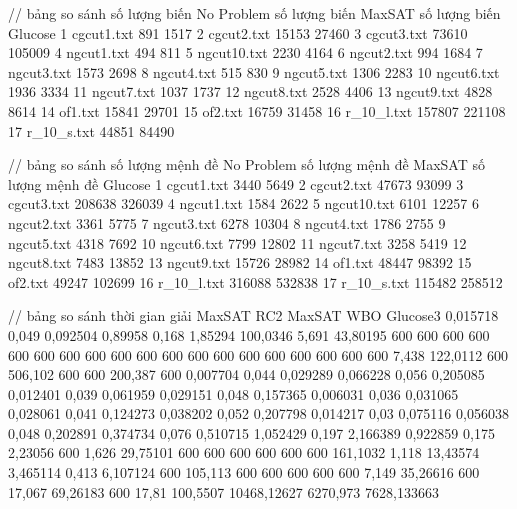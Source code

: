 // bảng so sánh số lượng biến
No	Problem	số lượng biến MaxSAT	số lượng biến Glucose
1	cgcut1.txt	891	1517
2	cgcut2.txt	15153	27460
3	cgcut3.txt	73610	105009
4	ngcut1.txt	494	811
5	ngcut10.txt	2230	4164
6	ngcut2.txt	994	1684
7	ngcut3.txt	1573	2698
8	ngcut4.txt	515	830
9	ngcut5.txt	1306	2283
10	ngcut6.txt	1936	3334
11	ngcut7.txt	1037	1737
12	ngcut8.txt	2528	4406
13	ngcut9.txt	4828	8614
14	of1.txt	15841	29701
15	of2.txt	16759	31458
16	r_10_l.txt	157807	221108
17	r_10_s.txt	44851	84490

// bảng so sánh số lượng mệnh đề
No	Problem	số lượng mệnh đề MaxSAT	số lượng mệnh đề Glucose
1	cgcut1.txt	3440	5649
2	cgcut2.txt	47673	93099
3	cgcut3.txt	208638	326039
4	ngcut1.txt	1584	2622
5	ngcut10.txt	6101	12257
6	ngcut2.txt	3361	5775
7	ngcut3.txt	6278	10304
8	ngcut4.txt	1786	2755
9	ngcut5.txt	4318	7692
10	ngcut6.txt	7799	12802
11	ngcut7.txt	3258	5419
12	ngcut8.txt	7483	13852
13	ngcut9.txt	15726	28982
14	of1.txt	48447	98392
15	of2.txt	49247	102699
16	r_10_l.txt	316088	532838
17	r_10_s.txt	115482	258512

// bảng so sánh thời gian giải
MaxSAT RC2	MaxSAT WBO	Glucose3
0,015718	0,049	0,092504
0,89958	0,168	1,85294
100,0346	5,691	43,80195
600	600	600
600	600	600
600	600	600
600	600	600
600	600	600
600	600	600
600	7,438	122,0112
600	506,102	600
600	200,387	600
0,007704	0,044	0,029289
0,066228	0,056	0,205085
0,012401	0,039	0,061959
0,029151	0,048	0,157365
0,006031	0,036	0,031065
0,028061	0,041	0,124273
0,038202	0,052	0,207798
0,014217	0,03	0,075116
0,056038	0,048	0,202891
0,374734	0,076	0,510715
1,052429	0,197	2,166389
0,922859	0,175	2,23056
600	1,626	29,75101
600	600	600
600	600	600
161,1032	1,118	13,43574
3,465114	0,413	6,107124
600	105,113	600
600	600	600
600	7,149	35,26616
600	17,067	69,26183
600	17,81	100,5507
10468,12627	6270,973	7628,133663